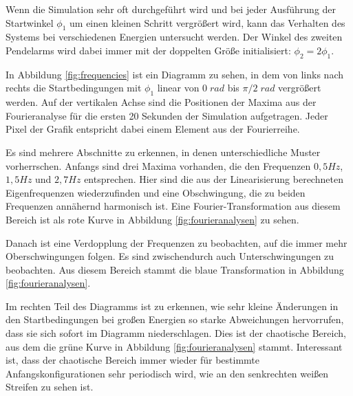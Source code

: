 Wenn die Simulation sehr oft durchgeführt wird und bei jeder Ausführung der Startwinkel $\phi_1$ um einen kleinen Schritt vergrößert wird, kann das Verhalten des Systems bei verschiedenen Energien untersucht werden.
Der Winkel des zweiten Pendelarms wird dabei immer mit der doppelten Größe initialisiert: $\phi_2 = 2\phi_1$.

In Abbildung \ref{fig:frequencies} ist ein Diagramm zu sehen, in dem von links nach rechts die Startbedingungen mit $\phi_1$ linear von $0\;rad$ bis $\pi/2\;rad$ vergrößert werden.
Auf der vertikalen Achse sind die Positionen der Maxima aus der Fourieranalyse für die ersten 20 Sekunden der Simulation aufgetragen.
Jeder Pixel der Grafik entspricht dabei einem Element aus der Fourierreihe.

Es sind mehrere Abschnitte zu erkennen, in denen unterschiedliche Muster vorherrschen.
Anfangs sind drei Maxima vorhanden, die den Frequenzen $0,5 Hz$, $1,5 Hz$ und $2,7 Hz$ entsprechen.
Hier sind die aus der Linearisierung berechneten Eigenfrequenzen wiederzufinden und eine Obschwingung, die zu beiden Frequenzen annähernd harmonisch ist.
Eine Fourier-Transformation aus diesem Bereich ist als rote Kurve in Abbildung \ref{fig:fourieranalysen} zu sehen.

Danach ist eine Verdopplung der Frequenzen zu beobachten, auf die immer mehr Oberschwingungen folgen.
Es sind zwischendurch auch Unterschwingungen zu beobachten.
Aus diesem Bereich stammt die blaue Transformation in Abbildung \ref{fig:fourieranalysen}.

Im rechten Teil des Diagramms ist zu erkennen, wie sehr kleine Änderungen in den Startbedingungen bei großen Energien so starke Abweichungen hervorrufen, dass sie sich sofort im Diagramm niederschlagen.
Dies ist der chaotische Bereich, aus dem die grüne Kurve in Abbildung \ref{fig:fourieranalysen} stammt.
Interessant ist, dass der chaotische Bereich immer wieder für bestimmte Anfangskonfigurationen sehr periodisch wird, wie an den senkrechten weißen Streifen zu sehen ist.

